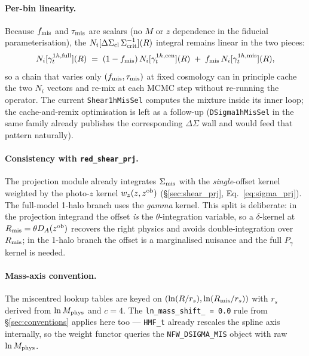 \documentclass[a4paper, 11pt]{article}
\newcommand{\zob}{z^{\rm ob}}
\newcommand{\modname}[1]{\textcolor{kwcol}{\texttt{#1}}}
\begin{document}
\paragraph{Per-bin linearity.}  Because $f_{\rm mis}$ and
$\tau_{\rm mis}$ are scalars (no $M$ or $z$ dependence in the
fiducial parameterisation), the
$N_i[\Delta\Sigma_{\rm cl}\,\Sigma_{\rm crit}^{-1}](R)$ integral
remains linear in the two pieces:
\begin{equation}
  N_i[\gamma_t^{1h, {\rm full}}](R)
  \;=\; (1 - f_{\rm mis})\, N_i[\gamma_t^{1h, {\rm cen}}](R)
       \;+\; f_{\rm mis}\, N_i[\gamma_t^{1h, {\rm mis}}](R),
\end{equation}
so a chain that varies only $(f_{\rm mis}, \tau_{\rm mis})$ at
fixed cosmology can in principle cache the two $N_i$ vectors and
re-mix at each MCMC step without re-running the operator.  The
current \modname{Shear1hMisSel} computes the mixture inside its
inner loop; the cache-and-remix optimisation is left as a
follow-up (\modname{DSigma1hMisSel} in the same family already
publishes the corresponding $\Delta\Sigma$ wall and would feed
that pattern naturally).

\paragraph{Consistency with \texttt{red\_shear\_prj}.}  The projection
module already integrates $\Sigma_{\rm mis}$ with the
\emph{single}-offset kernel weighted by the photo-$z$ kernel
$w_z(z, \zob)$ (\S\ref{sec:shear_prj}, Eq.~\eqref{eq:sigma_prj}).  The
full-model 1-halo branch uses the \emph{gamma} kernel.  This split is
deliberate: in the projection integrand the offset \emph{is} the
$\theta$-integration variable, so a $\delta$-kernel at
$R_{\rm mis} = \theta D_A(\zob)$ recovers the right physics and avoids
double-integration over $R_{\rm mis}$; in the 1-halo branch the offset
is a marginalised nuisance and the full $P_\gamma$ kernel is needed.

\paragraph{Mass-axis convention.}  The miscentred lookup tables are
keyed on $(\ln(R/r_s), \ln(R_{\rm mis}/r_s))$ with $r_s$ derived from
$\ln M_{\rm phys}$ and $c = 4$.  The
\texttt{ln\_mass\_shift\_ = 0.0} rule from \S\ref{sec:conventions}
applies here too --- \texttt{HMF\_t} already rescales the spline axis
internally, so the weight functor queries the
\texttt{NFW\_DSIGMA\_MIS} object with raw $\ln M_{\rm phys}$.
\end{document}
